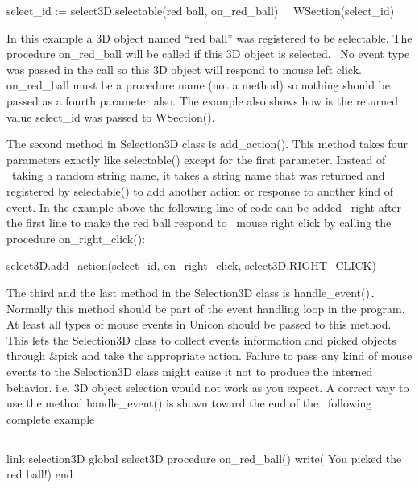 \documentclass[letterpaper]{article}
\begin{document}
{\sffamily
select\_id := select3D.selectable({\textquotedbl}red ball{\textquotedbl}, on\_red\_ball)~~ \newline
WSection(select\_id)}


\bigskip

{
In this example a 3D object named \textsf{{}``red ball''} was registered to be selectable. The procedure
\textsf{on\_red\_ball} will be called if this 3D object is selected. \ No event type was passed in the call so this 3D
object will respond to mouse left click. \textsf{on\_red\_ball} must be a procedure name (not a method) so nothing
should be passed as a fourth parameter also. The example also shows how is the returned value \textsf{select\_id} was
passed to \textsf{WSection().}}


\bigskip

{
The second method in Selection3D class is \textsf{add\_action()}. This method takes four parameters exactly like
\textsf{selectable()} except for the first parameter. Instead of \ taking a random string name, it takes a string name
that was returned and registered by \textsf{selectable()} to add another action or response to another kind of event.
In the example above the following line of code can be added \ right after the first line to make the red ball respond
to \ mouse right click by calling the procedure \textsf{on\_right\_click():}}


\bigskip

{\sffamily
select3D.add\_action(select\_id, on\_right\_click, select3D.RIGHT\_CLICK)~~ \newline
}

{
The third and the last method in the Selection3D class is \textsf{handle\_event()}\texttt{.} Normally this method should
be part of the event handling loop in the program. At least all types of mouse events in Unicon should be passed to
this method. This lets the \textsf{Selection3D} class to collect events information and picked objects through
\textsf{\&pick} and take the appropriate action. Failure to pass any kind of mouse events to the \textsf{Selection3D}
class might cause it not to produce the interned behavior. i.e. 3D object selection would not work as you expect. A
correct way to use the method \textsf{handle\_event}\textsf{()} is shown toward the end of the \ following complete
example}

\subsection[]{\color{black} }
{\sffamily
link selection3D\newline
global select3D\newline
procedure on\_red\_ball()\newline
 write({\textquotedbl} You picked the red ball!{\textquotedbl}) \newline
end}
\end{document}
